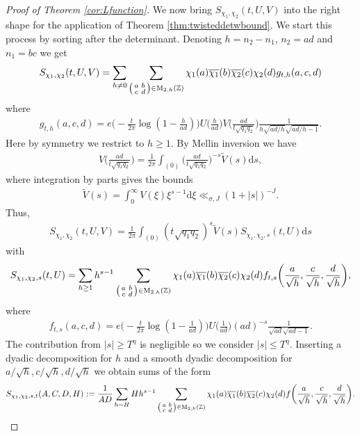 \documentclass[12pt]{amsart}
\theoremstyle{definition}
\theoremstyle{remark}
\numberwithin{equation}{section}
\newcommand{\Z}{{\mathbb Z}}
\newcommand{\1}{{\mathbf 1}}
\newcommand{\MM}{\operatorname{M}}
\renewcommand{\d}{\mathrm d}
\begin{document}
\begin{proof}[Proof of Theorem \ref{cor:Lfunction}]
We now bring $ S_{\chi_1,\chi_2} (t,U,V) $ into the right shape for the application of Theorem \ref{thm:twisteddetwbound}. We start this process by sorting after the determinant. Denoting $h= n_2-n_1$, $n_2=ad$ and $n_1=bc$ we get
\begin{align*}
     S_{\chi_1,\chi_2}(t,U,V)=\sum_{h \neq 0} \sum_{\smqty(a& b \\ c & d)\in \MM_{2,h}(\Z)} \chi_1(a)\overline{\chi_1}(b)\overline{\chi_2}(c) \chi_2(d) g_{t,h}(a,c,d)
\end{align*}
where
\begin{align*}
    g_{t,h}(a,c,d)= e\bigg( -\frac{t}{2 \pi } \log( 1-\frac{h}{ad})\bigg) U\bigg(\frac{h}{ad}\bigg) V\bigg( \frac{ad}{t \sqrt{q_1 q_2}}\bigg) \frac{1}{h\sqrt{ad/h}\sqrt{ad/h-1}}.
\end{align*}
Here by symmetry we restrict to $h \geq 1$.  By Mellin inversion we have
\begin{align*}
    V\bigg( \frac{ad}{t \sqrt{q_1 q_2}}\bigg) = \frac{1}{2\pi } \int_{(0)} \bigg( \frac{ad}{t \sqrt{q_1 q_2}}\bigg)^{-s} \widetilde{V}(s) \d s,
\end{align*}
where integration by parts gives the bounds
\begin{align*}
   \widetilde{V}(s) = \int_0^\infty V(\xi) \xi^{s-1} \d \xi  \ll_{\sigma,J} (1+|s|)^{-J}.  
\end{align*}
Thus,
\begin{align*}
     S_{\chi_1,\chi_2}(t,U,V) =  \frac{1}{2\pi } \int_{(0)}  (t\sqrt{q_1q_2})^{s}   \widetilde{V}(s)  S_{\chi_1,\chi_2,s}(t,U)\d s
\end{align*}
with
\begin{align*}
    S_{\chi_1,\chi_2,s}(t,U) =  \sum_{h \geq 1} h^{s-1} \sum_{\smqty(a& b \\ c & d)\in \MM_{2,h}(\Z)} \chi_1(a)\overline{\chi_1}(b)\overline{\chi_2}(c) \chi_2(d) f_{t,s}\bigg(\frac{a}{\sqrt{h}},\frac{c}{\sqrt{h}},\frac{d}{\sqrt{h}}\bigg),
\end{align*}
where
\begin{align*}
    f_{t,s}(a,c,d)  = e\bigg( -\frac{t}{2 \pi } \log( 1-\frac{1}{ad})\bigg) U\bigg(\frac{1}{ad}\bigg)  (ad)^{-s} \frac{1}{\sqrt{ad}\sqrt{ad-1}}.
\end{align*}
The contribution from $|s| \geq T^\eta$ is negligible so we consider $|s| \leq T^\eta$. Inserting a dyadic decomposition for $h$ and a smooth dyadic decomposition for $a/\sqrt{h},c/\sqrt{h},d/\sqrt{h}$ we obtain sums of the form
\begin{align*}
     S_{\chi_1,\chi_2,s,t}(A,C,D,H) := \frac{1}{AD}  \sum_{h \sim H}  H h^{s-1} \sum_{\smqty(a& b \\ c & d)\in \MM_{2,h}(\Z)} \chi_1(a)\overline{\chi_1}(b)\overline{\chi_2}(c) \chi_2(d) f\bigg(\frac{a}{\sqrt{h}},\frac{c}{\sqrt{h}},\frac{d}{\sqrt{h}}\bigg).

\end{align*}
\end{proof}
\end{document}

